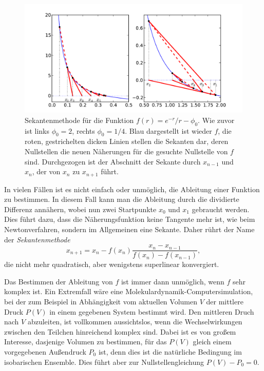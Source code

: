 \section{}

\begin{figure}
  \centering
  \includegraphics[width=\textwidth]{plots/sekanten}
  \caption{Sekantenmethode für die Funktion $f(r) = e^{-r}/r -
    \phi_0$. Wie zuvor ist links $\phi_0=2$, rechts $\phi_0=1/4$.
    Blau dargestellt ist wieder $f$, die roten, gestrichelten dicken
    Linien stellen die Sekanten dar, deren Nullstellen die neuen
    Näherungen für die gesuchte Nullstelle von $f$ sind. Durchgezogen
    ist der Abschnitt der Sekante durch $x_{n-1}$ und $x_n$, der von $x_n$
    zu $x_{n+1}$ führt.}
  \label{fig:sekanten}
\end{figure}

In vielen Fällen ist es nicht einfach oder unmöglich, die Ableitung
einer Funktion zu bestimmen. In diesem Fall kann man die Ableitung
durch die dividierte Differenz annähern, wobei nun zwei Startpunkte
$x_0$ und $x_1$ gebraucht werden. Dies führt dazu, dass die
Näherungsfunktion keine Tangente mehr ist, wie beim Newtonverfahren,
sondern im Allgemeinen eine Sekante. Daher rührt der Name der
\emph{Sekantenmethode}
\begin{equation}
  x_{n+1} = x_n - f(x_n)\frac{x_n - x_{n-1}}{f(x_n) - f(x_{n-1})},
\end{equation}
die nicht mehr quadratisch, aber wenigstens superlinear konvergiert.

Das Bestimmen der Ableitung von $f$ ist immer dann unmöglich, wenn $f$
sehr komplex ist. Ein Extremfall wäre eine
Molekulardynamik-Computersimulation, bei der zum Beispiel in
Abhängigkeit vom aktuellen Volumen $V$ der mittlere Druck $P(V)$ in
einem gegebenen System bestimmt wird. Den mittleren Druch nach $V$
abzuleiten, ist vollkommen aussichtslos, wenn die Wechselwirkungen
zwischen den Teilchen hinreichend komplex sind. Dabei ist es von
großem Interesse, dasjenige Volumen zu bestimmen, für das $P(V)$
gleich einem vorgegebenen Außendruck $P_0$ ist, denn dies ist die
natürliche Bedingung im isobarischen Ensemble. Dies führt aber zur
Nullstellengleichung $P(V)-P_0 = 0$.

